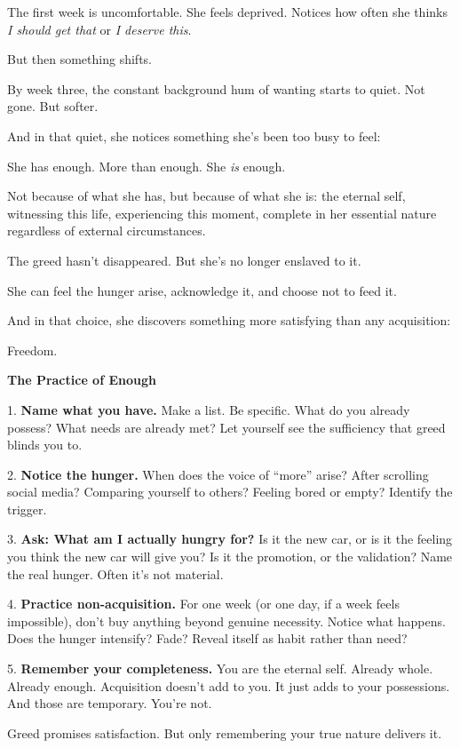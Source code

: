 \documentclass[11pt,twoside]{book}
\begin{document}
The first week is uncomfortable. She feels deprived. Notices how often she thinks \emph{I should get that} or \emph{I deserve this}.

But then something shifts.

By week three, the constant background hum of wanting starts to quiet. Not gone. But softer.

And in that quiet, she notices something she's been too busy to feel:

She has enough. More than enough. She \emph{is} enough.

Not because of what she has, but because of what she is: the eternal self, witnessing this life, experiencing this moment, complete in her essential nature regardless of external circumstances.

The greed hasn't disappeared. But she's no longer enslaved to it.

She can feel the hunger arise, acknowledge it, and choose not to feed it.

And in that choice, she discovers something more satisfying than any acquisition:

Freedom.

\begin{practicebox}
\textbf{The Practice of Enough}

1. \textbf{Name what you have.} Make a list. Be specific. What do you already possess? What needs are already met? Let yourself see the sufficiency that greed blinds you to.

2. \textbf{Notice the hunger.} When does the voice of ``more'' arise? After scrolling social media? Comparing yourself to others? Feeling bored or empty? Identify the trigger.

3. \textbf{Ask: What am I actually hungry for?} Is it the new car, or is it the feeling you think the new car will give you? Is it the promotion, or the validation? Name the real hunger. Often it's not material.

4. \textbf{Practice non-acquisition.} For one week (or one day, if a week feels impossible), don't buy anything beyond genuine necessity. Notice what happens. Does the hunger intensify? Fade? Reveal itself as habit rather than need?

5. \textbf{Remember your completeness.} You are the eternal self. Already whole. Already enough. Acquisition doesn't add to you. It just adds to your possessions. And those are temporary. You're not.

Greed promises satisfaction. But only remembering your true nature delivers it.
\end{practicebox}
\end{document}
